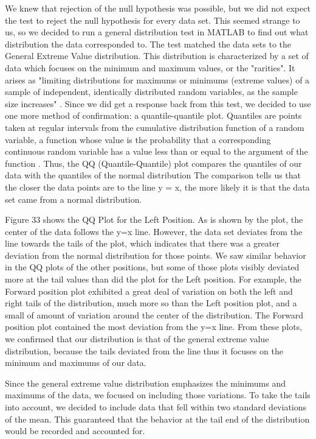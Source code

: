 \documentclass[letterpaper,english, 12pt]{article}
\begin{document}
We knew that rejection of the null hypothesis was possible, but we did not expect the test to reject the null hypothesis for every data set. This seemed strange to us, so we decided to run a general distribution test in MATLAB to find out what distribution the data corresponded to.
The test matched the data sets to the General Extreme Value distribution. This distribution is characterized by a set of data which focuses on the minimum and maximum values, or the "rarities". It arises as "limiting distributions for maximums or minimums (extreme values) of a sample of independent, identically distributed random variables, as the sample size increases" \cite{cit12}. Since we did get a response back from this test, we decided to use one more method of confirmation: a quantile-quantile plot. Quantiles are points taken at regular intervals from the cumulative distribution function of a random variable, a function whose value is the probability that a corresponding continuous random variable has a value less than or equal to the argument of the function \cite{cit4}. Thus, the QQ (Quantile-Quantile) plot compares the quantiles of our data with the quantiles of the normal distribution The comparison tells us that the closer the data points are to the line y = x, the more likely it is that the data set came from a normal distribution.

Figure 33 shows the QQ Plot for the Left Position. As is shown by the plot, the center of the data follows the y=x line. However, the data set deviates from the line towards the tails of the plot, which indicates that there was a greater deviation from the normal distribution for those points. We saw similar behavior in the QQ plots of the other positions, but some of those plots visibly deviated more at the tail values than did the plot for the Left position. For example, the Forward position plot exhibited a great deal of variation on both the left and right tails of the distribution, much more so than the Left position plot, and a small of amount of variation around the center of the distribution. The Forward position plot contained the most deviation from the y=x line. From these plots, we confirmed that our distribution is that of the general extreme value distribution, because the tails deviated from the line thus it focuses on the minimum and maximums of our data.

Since the general extreme value distribution emphasizes the minimums and maximums of the data, we focused on including those variations. To take the tails into account, we decided to include data that fell within two standard deviations of the mean. This guaranteed that the behavior at the tail end of the distribution would be recorded and accounted for.
\end{document}
